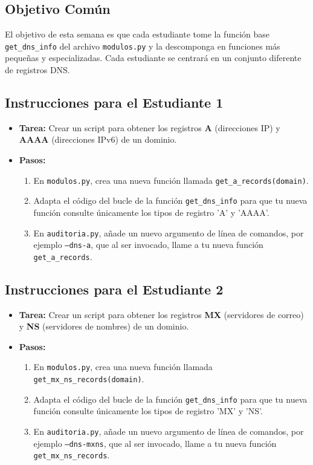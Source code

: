 \documentclass[12pt]{article}
\begin{document}
\subsection*{Objetivo Común}
El objetivo de esta semana es que cada estudiante tome la función base \texttt{get\_dns\_info} del archivo \texttt{modulos.py} y la descomponga en funciones más pequeñas y especializadas. Cada estudiante se centrará en un conjunto diferente de registros DNS.

\subsection*{Instrucciones para el Estudiante 1}
\begin{itemize}
    \item \textbf{Tarea:} Crear un script para obtener los registros \textbf{A} (direcciones IP) y \textbf{AAAA} (direcciones IPv6) de un dominio.
    \item \textbf{Pasos:}
    \begin{enumerate}
        \item En \texttt{modulos.py}, crea una nueva función llamada \texttt{get\_a\_records(domain)}.
        \item Adapta el código del bucle de la función \texttt{get\_dns\_info} para que tu nueva función consulte únicamente los tipos de registro 'A' y 'AAAA'.
        \item En \texttt{auditoria.py}, añade un nuevo argumento de línea de comandos, por ejemplo \texttt{--dns-a}, que al ser invocado, llame a tu nueva función \texttt{get\_a\_records}.
    \end{enumerate}
\end{itemize}

\subsection*{Instrucciones para el Estudiante 2}
\begin{itemize}
    \item \textbf{Tarea:} Crear un script para obtener los registros \textbf{MX} (servidores de correo) y \textbf{NS} (servidores de nombres) de un dominio.
    \item \textbf{Pasos:}
    \begin{enumerate}
        \item En \texttt{modulos.py}, crea una nueva función llamada \texttt{get\_mx\_ns\_records(domain)}.
        \item Adapta el código del bucle de la función \texttt{get\_dns\_info} para que tu nueva función consulte únicamente los tipos de registro 'MX' y 'NS'.
        \item En \texttt{auditoria.py}, añade un nuevo argumento de línea de comandos, por ejemplo \texttt{--dns-mxns}, que al ser invocado, llame a tu nueva función \texttt{get\_mx\_ns\_records}.
    \end{enumerate}
\end{itemize}
\end{document}
